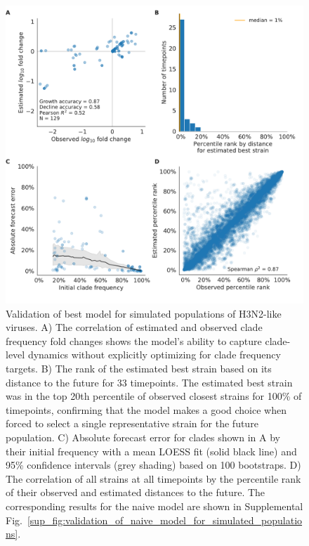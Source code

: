\begin{figure}[H]
  \begin{center}
  \includegraphics[width=\textwidth]{figures/validation_figure_simulated-simulated_sample_3-normalized_fitness.pdf}
  \caption{
  Validation of best model for simulated populations of H3N2-like viruses.
  A) The correlation of estimated and observed clade frequency fold changes shows the model's ability to capture clade-level dynamics without explicitly optimizing for clade frequency targets.
  B) The rank of the estimated best strain based on its distance to the future for 33 timepoints.
  The estimated best strain was in the top 20th percentile of observed closest strains for 100\% of timepoints, confirming that the model makes a good choice when forced to select a single representative strain for the future population.
  C) Absolute forecast error for clades shown in A by their initial frequency with a mean LOESS fit (solid black line) and 95\% confidence intervals (grey shading) based on 100 bootstraps.
  D) The correlation of all strains at all timepoints by the percentile rank of their observed and estimated distances to the future.
  The corresponding results for the naive model are shown in Supplemental Fig.~\ref{sup_fig:validation_of_naive_model_for_simulated_populations}.
  }
  \label{sup_fig:validation_of_best_model_for_simulated_populations}
  \end{center}
\end{figure}

